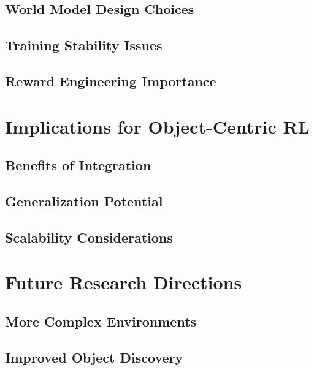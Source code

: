 \documentclass[
	english,
	ruledheaders=section,
	class=report,
	thesis={type=master},
	accentcolor=9c,
	custommargins=true,
	marginpar=false,
	parskip=half-,
	fontsize=11pt,
]{tudapub}
\begin{document}
\subsection{World Model Design Choices}
\label{subsec:design_choices}

\subsection{Training Stability Issues}
\label{subsec:stability_issues}

\subsection{Reward Engineering Importance}
\label{subsec:reward_engineering}

\section{Implications for Object-Centric RL}
\label{sec:implications}

\subsection{Benefits of Integration}
\label{subsec:integration_benefits}

\subsection{Generalization Potential}
\label{subsec:generalization_potential}

\subsection{Scalability Considerations}
\label{subsec:scalability}

\section{Future Research Directions}
\label{sec:future_work}

\subsection{More Complex Environments}
\label{subsec:complex_environments}

\subsection{Improved Object Discovery}
\label{subsec:object_discovery}
\end{document}
